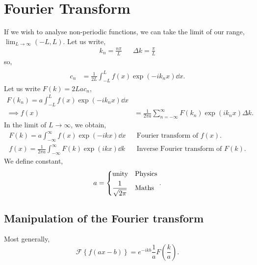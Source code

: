 \documentclass{book}
\begin{document}
\chapter{Fourier Transform}
If we wish to analyse non-periodic functions, we can take the limit of our range, $\lim_{L\to\infty}(-L,L)$. Let us write,
\begin{align}
	k_n = \frac{n\pi}{L} && \Delta k = \frac{\pi}{L}
\end{align}
so,
\begin{align}
	 \\
	c_n & = \frac{1}{2L}\int_{-L}^{L}f(x)\exp\left(-ik_nx\right)\dd{x}.
\end{align}
Let us write $F(k) = 2Lac_n$,
\begin{align}
	F(k_n) = a\int_{-L}^{L}f(x)\exp\left(-ik_nx\right)\dd{x} \\
	\implies f(x) &= \frac{1}{2\pi a}\sum_{n = -\infty}^{\infty} F(k_n)\exp\left(i k_nx\right)\Delta k.
\end{align}
In the limit of $L \to \infty$, we obtain,
\begin{align}
	\boxed{F(k) = a\int_{-\infty}^{\infty}f(x)\exp(-ikx)\dd{x}} && \text{Fourier transform of $f(x)$.}\\
	\boxed{f(x) = \frac{1}{2\pi a}\int_{-\infty}^{\infty}F(k)\exp(ikx)\dd{k}} && \text{Inverse Fourier transform of $F(k)$.}
\end{align}
We define constant,
\begin{equation}
	a = \begin{dcases}
		\text{unity} & \text{Physics} \\
		\frac{1}{\sqrt{2\pi}} & \text{Maths}
	\end{dcases}.
\end{equation}
\section{Manipulation of the Fourier transform}
Most generally,
\begin{equation}
	\boxed{\mathscr{F}\left\{f(ax - b)\right\} = e^{-ikb}\frac{1}{a}F\left(\frac{k}{a}\right)}.
\end{equation}
\end{document}
